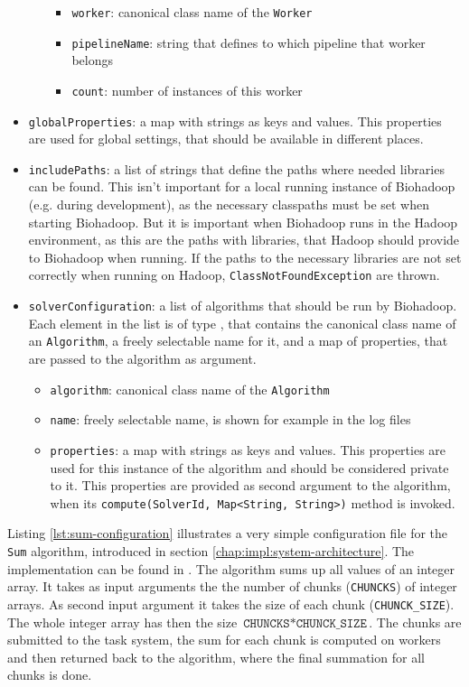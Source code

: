 \begin{itemize}
\begin{itemize}
\begin{itemize}
         \item \texttt{worker}: canonical class name of the \texttt{Worker}
         \item \texttt{pipelineName}: string that defines to which pipeline that worker belongs
         \item \texttt{count}: number of instances of this worker
       \end{itemize}
    \end{itemize}
    \item \texttt{globalProperties}: a map with strings as keys and values. This properties are used for global settings, that should be available in different places.
    \item \texttt{includePaths}: a list of strings that define the paths where needed libraries can be found. This isn't important for a local running instance of Biohadoop (e.g. during development), as the necessary classpaths must be set when starting Biohadoop. But it is important when Biohadoop runs in the Hadoop environment, as this are the paths with libraries, that Hadoop should provide to Biohadoop when running. If the paths to the necessary libraries are not set correctly when running on Hadoop, \texttt{ClassNotFoundException} are thrown.
    \item \texttt{solverConfiguration}: a list of algorithms that should be run by Biohadoop. Each element in the list is of type , that contains the canonical class name of an \texttt{Algorithm}, a freely selectable name for it, and a map of properties, that are passed to the algorithm as argument.
    \begin{itemize}
      \item \texttt{algorithm}: canonical class name of the \texttt{Algorithm}
      \item \texttt{name}: freely selectable name, is shown for example in the log files
      \item \texttt{properties}: a map with strings as keys and values. This properties are used for this instance of the algorithm and should be considered private to it. This properties are provided as second argument to the algorithm, when its \texttt{compute(SolverId, Map<String, String>)} method is invoked.
    \end{itemize}
  \end{itemize}

  Listing \ref{lst:sum-configuration} illustrates a very simple configuration file for the \texttt{Sum} algorithm, introduced in section \ref{chap:impl:system-architecture}. The implementation can be found in \cite{biohadoop-algorithms}. The algorithm sums up all values of an integer array. It takes as input arguments the the number of chunks (\texttt{CHUNCKS}) of integer arrays. As second input argument it takes the size of each chunk (\texttt{CHUNCK\_SIZE}). The whole integer array has then the size $\texttt{CHUNCKS} * \texttt{CHUNCK\_SIZE}$. The chunks are submitted to the task system, the sum for each chunk is computed on workers and then returned back to the algorithm, where the final summation for all chunks is done.

